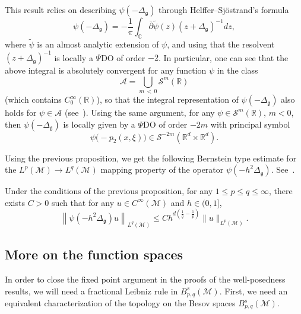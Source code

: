 \documentclass[AHL,Unicode,longabstracts,published]{cedram}
\newcommand{\R}{\mathbb{R}}
\newcommand{\C}{\mathbb{C}}
\newcommand{\A}{\mathcal{A}}
\renewcommand{\S}{\mathcal{S}}
\newcommand{\M}{\mathcal{M}}
\newcommand{\g}{\mathfrak{g}}
\newcommand{\Dlg}{\Delta_{\g}}
\begin{document}
\begin{rema}\label{rk-pdolocal}
This result relies on describing $\psi(-\Dlg)$ through Helffer--Sj\"ostr\-and's formula
\begin{equation*}
\psi(-\Dlg)=-\frac{1}{\pi}\int_{\C}\bar{\partial}\widetilde{\psi}(z) (z+\Dlg)^{-1}dz,
\end{equation*}
where $\widetilde{\psi}$ is an almost analytic extension of $\psi$, and using that the resolvent $(z+\Dlg)^{-1}$ is locally a $\Psi$DO of order $-2$. In particular, one can see that the above integral is absolutely convergent for any function $\psi$ in the class
\begin{equation*}
\A = \bigcup_{m\,<\,0}\S^m(\R)
\end{equation*}
(which contains $C_0^{\infty}(\R)$), so that the integral representation of $\psi(-\Dlg)$ also holds for $\psi\in\A$ (see~\cite[Chapter~2]{Davies}). Using the same argument, for any $\psi\in\S^m(\R)$, $m<0$, then $\psi(-\Dlg)$ is locally given by a $\Psi$DO of order $-2m$ with principal symbol
\begin{equation*}
\psi\big(-p_{2}(x,\xi)\big)\in\S^{-2m}\left(\R^d\times\R^d\right).
\end{equation*}
\end{rema}

Using the previous proposition, we get the following Bernstein type estimate for the $L^p(\M)\rightarrow L^q(\M)$ mapping property of the operator $\psi(-h^2\Dlg)$. See~\cite[Corollary~2.4]{BGT}.

\begin{coro}\label{lem-boundedness-psi-delta}
Under the conditions of the previous proposition, for any $1\leq p\leq q\leq \infty$, there exists $C>0$ such that for any $u\in C^{\infty}(\M)$ and $h\in (0,1]$,
\begin{equation*}
\left\|\psi\left(-h^2\Dlg\right)u\right\|_{L^q(\M)}\le C h^{d\left(\frac{1}{q}-\frac{1}{p}\right)}\|u\|_{L^p(\M)}.
\end{equation*}
\end{coro}


\subsection{More on the function spaces}
In order to close the fixed point argument in the proofs of the well-posedness results, we will need a fractional Leibniz rule in $B^s_{p,q}(\M)$. First, we need an equivalent characterization of the topology on the Besov spaces $B^s_{p,q}(\M)$.
\end{document}
